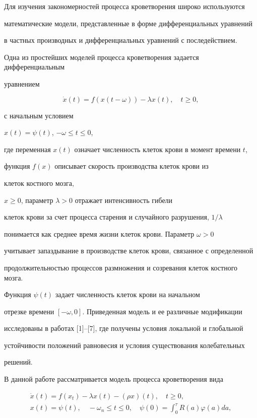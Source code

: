 \label{begin}








Для изучения закономерностей процесса кроветворения широко используются


математические модели, представленные в форме дифференциальных уравнений


в частных производных и дифференциальных уравнений с последействием.


Одна из простейших моделей процесса кроветворения задается дифференциальным


уравнением


$$


\Dot{x}(t)=f(x(t-\omega)) - \lambda x(t), \quad t \geq 0,


$$


с начальным условием


$x(t)=\psi (t)$,  $- \omega \leq t \leq 0$,


где переменная $x(t)$ означает численность клеток крови в момент времени $t$,


функция $f(x)$  описывает скорость производства клеток крови из


клеток костного мозга,


$x \geq 0$, параметр $\lambda > 0$ отражает интенсивность гибели


клеток крови за счет процесса старения и случайного разрушения, $1/\lambda$


понимается как среднее время жизни клеток крови. Параметр $\omega > 0$


учитывает запаздывание в производстве клеток крови, связанное с определенной


продолжительностью процессов размножения и созревания клеток костного мозга.


Функция $\psi (t)$ задает численность клеток крови на начальном


отрезке времени $[-\omega,0]$. Приведенная модель и ее различные модификации


исследованы в работах [1]--[7], где получены условия локальной и глобальной


устойчивости положений равновесия и условия существования колебательных


решений.





В данной работе рассматривается модель процесса кроветворения вида


\begin{gather}


\Dot{x}(t)=f(x_{t}) - \lambda x(t) - (\rho x) (t), \quad t \geq 0,\\


x(t)=\psi (t),  \quad - \omega_{n} \leq t \leq 0, \quad


\psi(0)=\int_{0}^{\tau} R(a) \varphi(a) da,


\end{gather}


